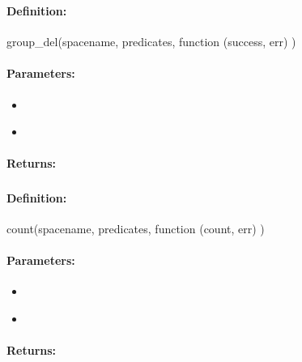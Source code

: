 \subsubsection{}
\label{api:nodejs:group_del}


\paragraph{Definition:}
\begin{javascriptcode}
group_del(spacename, predicates, function (success, err) {})
\end{javascriptcode}
\paragraph{Parameters:}
\begin{itemize}[noitemsep]
\item {}\\

\item {}\\

\end{itemize}

\paragraph{Returns:}


\pagebreak
\subsubsection{}
\label{api:nodejs:count}


\paragraph{Definition:}
\begin{javascriptcode}
count(spacename, predicates, function (count, err) {})
\end{javascriptcode}
\paragraph{Parameters:}
\begin{itemize}[noitemsep]
\item {}\\

\item {}\\

\end{itemize}

\paragraph{Returns:}

